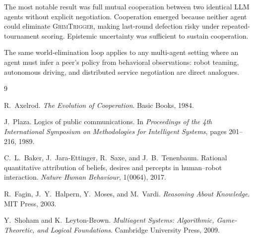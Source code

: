 \documentclass[11pt]{article}
\begin{document}
The most notable result was full mutual cooperation between two identical LLM agents without
explicit negotiation. Cooperation emerged because neither agent could eliminate
\textsc{GrimTrigger}, making last-round defection risky under repeated-tournament scoring.
Epistemic uncertainty was sufficient to sustain cooperation.

The same world-elimination loop applies to any multi-agent setting where an agent must infer
a peer's policy from behavioral observations: robot teaming, autonomous driving, and
distributed service negotiation are direct analogues.

\begin{thebibliography}{9}

R.\ Axelrod.
\newblock \textit{The Evolution of Cooperation}.
\newblock Basic Books, 1984.

J.\ Plaza.
\newblock Logics of public communications.
\newblock In \textit{Proceedings of the 4th International Symposium on Methodologies for
Intelligent Systems}, pages 201--216, 1989.

C.\ L.\ Baker, J.\ Jara-Ettinger, R.\ Saxe, and J.\ B.\ Tenenbaum.
\newblock Rational quantitative attribution of beliefs, desires and percepts in human--robot
interaction.
\newblock \textit{Nature Human Behaviour}, 1(0064), 2017.

R.\ Fagin, J.\ Y.\ Halpern, Y.\ Moses, and M.\ Vardi.
\newblock \textit{Reasoning About Knowledge}.
\newblock MIT Press, 2003.

Y.\ Shoham and K.\ Leyton-Brown.
\newblock \textit{Multiagent Systems: Algorithmic, Game-Theoretic, and Logical Foundations}.
\newblock Cambridge University Press, 2009.

\end{thebibliography}
\end{document}
